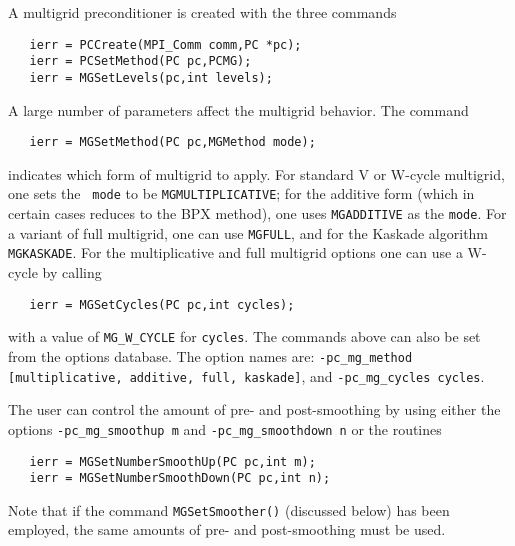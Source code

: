 A multigrid preconditioner is created with the three commands 
\begin{verbatim}
   ierr = PCCreate(MPI_Comm comm,PC *pc);
   ierr = PCSetMethod(PC pc,PCMG);
   ierr = MGSetLevels(pc,int levels);
\end{verbatim}
A  
large number of parameters affect the multigrid behavior. The command
\begin{verbatim}
   ierr = MGSetMethod(PC pc,MGMethod mode); 
\end{verbatim}
indicates   which
   form of
multigrid to apply.  For standard V or W-cycle multigrid, one sets the {\tt
mode} to be  {\tt MGMULTIPLICATIVE}; for the
additive form (which in certain cases reduces to the BPX method), one uses
 {\tt MGADDITIVE} as the {\tt mode}.  For a variant
of full multigrid, one can
 use  {\tt MGFULL}, and for the Kaskade 
algorithm  {\tt MGKASKADE}.
For the multiplicative and full multigrid options one can use a
W-cycle by   calling
 
\begin{verbatim}
   ierr = MGSetCycles(PC pc,int cycles);
\end{verbatim}
with a value of {\tt MG\_W\_CYCLE} for {\tt cycles}. 
The commands above can also be set from the options database. The option 
names are: {\tt -pc\_mg\_method [multiplicative, additive, full, kaskade]},
and {\tt -pc\_mg\_cycles cycles}.  

The user can control the amount of pre- and post-smoothing 
  by using
either the options  
{\tt -pc\_mg\_smoothup~m} and {\tt -pc\_mg\_smoothdown~n} or
the routines  
\begin{verbatim}
   ierr = MGSetNumberSmoothUp(PC pc,int m);
   ierr = MGSetNumberSmoothDown(PC pc,int n);
\end{verbatim}
Note that if the command {\tt MGSetSmoother()} (discussed below) has
 been employed, the same amounts of pre-
and post-smoothing must be used.

